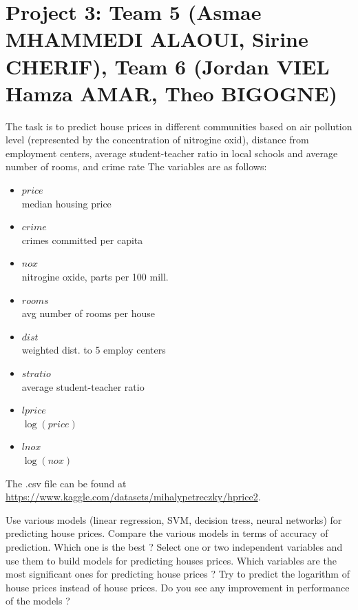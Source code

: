 \documentclass{article}
\begin{document}
 




\section*{Project 3:  Team 5 (Asmae MHAMMEDI ALAOUI, Sirine CHERIF), Team 6 (Jordan VIEL
Hamza AMAR, Theo BIGOGNE) }
    The task is to predict house prices in different communities based on air pollution level (represented by the concentration of nitrogine oxid), 
distance from employment centers, average student-teacher ratio 
 in local schools and average number of rooms, and crime rate The variables are as follows:
    \begin{itemize}
    \item{$price$ \\}       
	median housing price
    \item{$crime$ \\}                    
		crimes committed per capita
    \item{$nox$ \\}                      
	nitrogine oxide, parts per 100 mill.
    \item{$rooms$ \\}                    
    avg number of rooms per house
    \item{$dist$ \\}                     
      weighted dist. to 5 employ centers
    \item{$stratio$ \\}                  average student-teacher ratio
    \item{$lprice$ \\}                   $\log(price)$
    \item{$lnox$ \\}                     $\log(nox)$
   \end{itemize}

   The .csv file can be found at \url{https://www.kaggle.com/datasets/mihalypetreczky/hprice2}. 
    
     Use various models (linear regression, SVM, decision tress, neural networks) for predicting house prices. Compare the various models in terms of accuracy of prediction. Which one is the best ? 
 Select one or two independent variables  and use them to build models for predicting houses prices. Which variables are the most
 significant ones for predicting  house prices  ?  Try to predict the logarithm of house prices instead of house prices. Do you see any improvement in performance of the models ?
\end{document}
